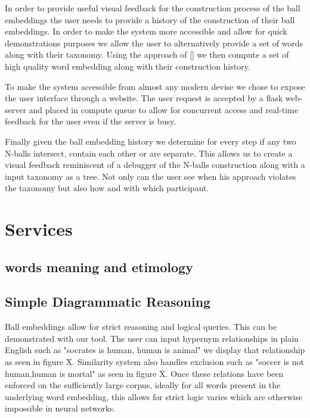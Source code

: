 \documentclass[]{article}
\begin{document}
In order to provide useful visual feedback for the construction process of the ball embeddings the user needs to provide a history of the construction of their ball embeddings. In order to make the system more accessible and allow for quick demonstrations purposes we allow the user to alternatively provide a set of words along with their taxonomy. Using the approach of [] we then compute a set of high quality word embedding along with their construction history.

To make the system accessible from almost any modern devise we chose to expose the user interface through a website. The user request is accepted by a flask web-server and placed in compute queue to allow for concurrent access and real-time feedback for the user even if the server is busy. 

Finally given the ball embedding history we determine for every step if any two N-balls intersect, contain each other or are separate. This allows us to create a visual feedback reminiscent of a debugger of the N-balls construction along with a input taxonomy as a tree. Not only can the user see when his approach violates the taxonomy but also how and with which participant.



\section{Services}

\subsection{words meaning and etimology}

\subsection{Simple Diagrammatic Reasoning}

Ball embeddings allow for strict reasoning and logical queries. This can be demonstrated with our tool. The user can input hypernym relationships in plain English such as "socrates is human, human is animal" we display that relationship as seen in figure X. Similarity system also handles exclusion such as "soccer is not human,human is mortal" as seen in figure X. Once these relations have been enforced on the sufficiently large corpus, ideally for all words present in the underlying word embedding, this allows for strict logic varies which are otherwise impossible in neural networks.
\end{document}
